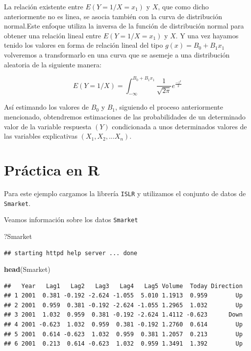 \documentclass[]{book}
\newenvironment{Shaded}{\begin{snugshade}}{\end{snugshade}}
\newcommand{\KeywordTok}[1]{\textcolor[rgb]{0.13,0.29,0.53}{\textbf{#1}}}
\newcommand{\NormalTok}[1]{#1}
\begin{document}
La relación existente entre \(E(Y= 1/X=x_1)\) y \(X\), que como dicho anteriormente no es linea, se asocia también con la curva de distribución normal.Este enfoque utiliza la inversa de la función de distribución normal para obtener una relación lineal entre \(E(Y= 1/X=x_1)\) y \(X\). Y una vez hayamos tenido los valores en forma de relación lineal del tipo \(g(x) = B_0+B_1x_1\) volveremos a transformarlo en una curva que se asemeje a una distribución aleatoria de la siguiente manera:

\[
E(Y=1/X) = \int_{-\infty}^{B_0+B_1 x_1}\frac{1}{\sqrt{2\pi}}e^{\frac{-z^2}{2}}
\]

Así estimando los valores de \(B_0\) y \(B_1\), siguiendo el proceso anteriormente mencionado, obtendremos estimaciones de las probabilidades de un determinado valor de la variable respuesta \((Y)\) condicionada a unos determinados valores de las variables explicativas \((X_1,X_2,...X_n)\).

\hypertarget{practica-en-r-2}{%
\section{Práctica en R}\label{practica-en-r-2}}

Para este ejemplo cargamos la librería \texttt{ISLR} y utilizamos el conjunto de datos de \texttt{Smarket}.

Veamos información sobre los datos \texttt{Smarket}

\begin{Shaded}
\begin{Highlighting}[]
\NormalTok{?Smarket}
\end{Highlighting}
\end{Shaded}

\begin{verbatim}
## starting httpd help server ... done
\end{verbatim}

\begin{Shaded}
\begin{Highlighting}[]
\KeywordTok{head}\NormalTok{(Smarket)}
\end{Highlighting}
\end{Shaded}

\begin{verbatim}
##   Year   Lag1   Lag2   Lag3   Lag4   Lag5 Volume  Today Direction
## 1 2001  0.381 -0.192 -2.624 -1.055  5.010 1.1913  0.959        Up
## 2 2001  0.959  0.381 -0.192 -2.624 -1.055 1.2965  1.032        Up
## 3 2001  1.032  0.959  0.381 -0.192 -2.624 1.4112 -0.623      Down
## 4 2001 -0.623  1.032  0.959  0.381 -0.192 1.2760  0.614        Up
## 5 2001  0.614 -0.623  1.032  0.959  0.381 1.2057  0.213        Up
## 6 2001  0.213  0.614 -0.623  1.032  0.959 1.3491  1.392        Up
\end{verbatim}
\end{document}
